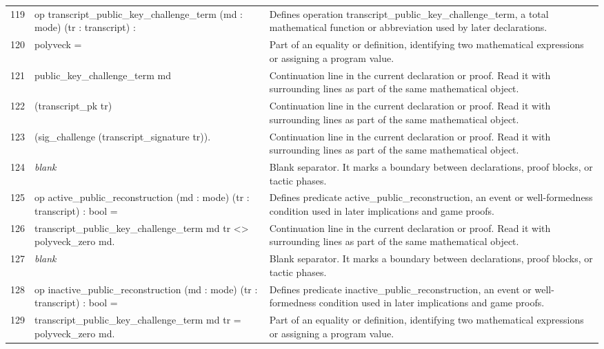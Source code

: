 \documentclass[10pt]{article}
\begin{document}
\begin{longtable}{r L{0.53\textwidth} L{0.37\textwidth}}
119 & {\ttfamily\scriptsize op transcript\_public\_key\_challenge\_term (md : mode) (tr : transcript) :} & Defines operation transcript\_public\_key\_challenge\_term, a total mathematical function or abbreviation used by later declarations. \\
120 & {\ttfamily\scriptsize   polyveck =} & Part of an equality or definition, identifying two mathematical expressions or assigning a program value. \\
121 & {\ttfamily\scriptsize   public\_key\_challenge\_term md} & Continuation line in the current declaration or proof.  Read it with surrounding lines as part of the same mathematical object. \\
122 & {\ttfamily\scriptsize     (transcript\_pk tr)} & Continuation line in the current declaration or proof.  Read it with surrounding lines as part of the same mathematical object. \\
123 & {\ttfamily\scriptsize     (sig\_challenge (transcript\_signature tr)).} & Continuation line in the current declaration or proof.  Read it with surrounding lines as part of the same mathematical object. \\
124 & {\ttfamily\scriptsize \emph{blank}} & Blank separator.  It marks a boundary between declarations, proof blocks, or tactic phases. \\
125 & {\ttfamily\scriptsize op active\_public\_reconstruction (md : mode) (tr : transcript) : bool =} & Defines predicate active\_public\_reconstruction, an event or well-formedness condition used in later implications and game proofs. \\
126 & {\ttfamily\scriptsize   transcript\_public\_key\_challenge\_term md tr <> polyveck\_zero md.} & Continuation line in the current declaration or proof.  Read it with surrounding lines as part of the same mathematical object. \\
127 & {\ttfamily\scriptsize \emph{blank}} & Blank separator.  It marks a boundary between declarations, proof blocks, or tactic phases. \\
128 & {\ttfamily\scriptsize op inactive\_public\_reconstruction (md : mode) (tr : transcript) : bool =} & Defines predicate inactive\_public\_reconstruction, an event or well-formedness condition used in later implications and game proofs. \\
129 & {\ttfamily\scriptsize   transcript\_public\_key\_challenge\_term md tr = polyveck\_zero md.} & Part of an equality or definition, identifying two mathematical expressions or assigning a program value. \\

\end{longtable}
\end{document}

